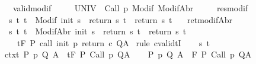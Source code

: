 \begin{isabellebody}
\ \ \ valid{\isacharunderscore}modif{\isacharcolon}\ \isanewline
\ \ {\isachardoublequoteopen}{\isasymforall}{\isasymsigma}{\isachardot}\ {\isasymGamma}{\isacharcomma}{\isasymTheta}\ {\isasymTurnstile}\isactrlbsub {\isacharslash}UNIV\isactrlesub \ {\isacharbraceleft}{\isasymsigma}{\isacharbraceright}\ {\isacharparenleft}Call\ p{\isacharparenright}\ {\isacharparenleft}Modif\ {\isasymsigma}{\isacharparenright}{\isacharcomma}{\isacharparenleft}ModifAbr\ {\isasymsigma}{\isacharparenright}{\isachardoublequoteclose}\ \isanewline
\ \ \ res{\isacharunderscore}modif{\isacharcolon}\isanewline
\ \ {\isachardoublequoteopen}{\isasymforall}s\ t{\isachardot}\ t\ {\isasymin}\ Modif\ {\isacharparenleft}init\ s{\isacharparenright}\ {\isasymlongrightarrow}\ return{\isacharprime}\ s\ t\ {\isacharequal}\ return\ s\ t{\isachardoublequoteclose}\isanewline
\ \ \ ret{\isacharunderscore}modifAbr{\isacharcolon}\ \isanewline
\ \ {\isachardoublequoteopen}{\isasymforall}s\ t{\isachardot}\ t\ {\isasymin}\ ModifAbr\ {\isacharparenleft}init\ s{\isacharparenright}\ {\isasymlongrightarrow}\ return{\isacharprime}\ s\ t\ {\isacharequal}\ return\ s\ t{\isachardoublequoteclose}\isanewline
\ \ \ {\isachardoublequoteopen}{\isasymGamma}{\isacharcomma}{\isasymTheta}\ {\isasymTurnstile}\isactrlsub t\isactrlbsub {\isacharslash}F\isactrlesub \ P\ {\isacharparenleft}call\ init\ p\ return\ c{\isacharparenright}\ Q{\isacharcomma}A{\isachardoublequoteclose}\isanewline
%
\isadelimproof
%
\endisadelimproof
%
\isatagproof
{}\isamarkupfalse%
\ {\isacharparenleft}rule\ cvalidtI{\isacharparenright}\isanewline
\ \ \isamarkupfalse%
\ s\ t\isanewline
\ \ \isamarkupfalse%
\ ctxt{\isacharcolon}\ {\isachardoublequoteopen}{\isasymforall}{\isacharparenleft}P{\isacharcomma}\ p{\isacharcomma}\ Q{\isacharcomma}\ A{\isacharparenright}{\isasymin}{\isasymTheta}{\isachardot}\ {\isasymGamma}\ {\isasymTurnstile}\isactrlsub t\isactrlbsub {\isacharslash}F\isactrlesub \ P\ {\isacharparenleft}Call\ p{\isacharparenright}\ Q{\isacharcomma}A{\isachardoublequoteclose}\isanewline
\ \ \isamarkupfalse%
\ {\isachardoublequoteopen}{\isasymforall}{\isacharparenleft}P{\isacharcomma}\ p{\isacharcomma}\ Q{\isacharcomma}\ A{\isacharparenright}{\isasymin}{\isasymTheta}{\isachardot}\ {\isasymGamma}\ {\isasymTurnstile}\isactrlbsub {\isacharslash}F\isactrlesub \ P\ {\isacharparenleft}Call\ p{\isacharparenright}\ Q{\isacharcomma}A{\isachardoublequoteclose}\ \isanewline
\ \ \ \ \isamarkupfalse%

\end{isabellebody}
